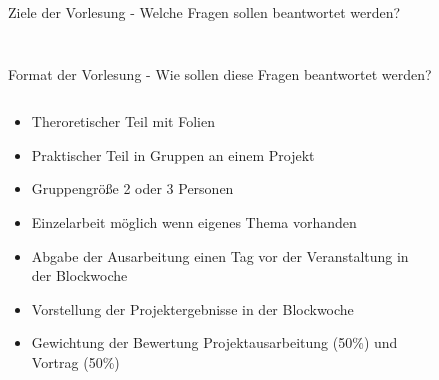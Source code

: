 \documentclass[aspectratio=1610, xcolor=dvipsnames, 9pt]{beamer}
\begin{document}
\begin{frame}{Ziele der Vorlesung - Welche Fragen sollen beantwortet werden?}
\begin{columns}
\begin{column}{0.3\textwidth}
\begin{figure}
             [\url{https://xkcd.com/2451/}]
 \end{figure}
    \end{column}
  \end{columns}
\end{frame}

\begin{frame}{Format der Vorlesung - Wie sollen diese Fragen beantwortet werden?}
  \begin{columns}
    \begin{column}{0.69\textwidth}
      \begin{itemize}
        \item Theroretischer Teil mit Folien \newline
        \item Praktischer Teil in Gruppen an einem Projekt  \newline
        \item Gruppengröße 2 oder 3 Personen \newline
        \item Einzelarbeit möglich wenn eigenes Thema vorhanden \newline
        \item Abgabe der Ausarbeitung einen Tag vor der Veranstaltung in der Blockwoche \newline
        \item Vorstellung der Projektergebnisse in der Blockwoche \newline
        \item Gewichtung der Bewertung Projektausarbeitung (50\%) und Vortrag (50\%)
        \end{itemize}
    \end{column}
    \begin{column}{0.3\textwidth}
 \begin{figure}
 \centering

\end{figure}
\end{column}
\end{columns}
\end{frame}
\end{document}
